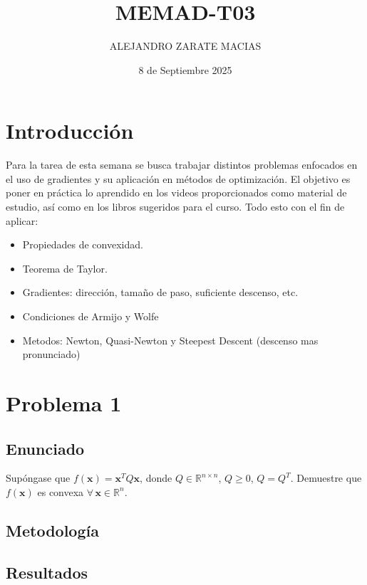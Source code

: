 \documentclass{article}
\title{MEMAD-T03}
\author{ALEJANDRO ZARATE MACIAS}
\date{8 de Septiembre 2025}
\begin{document}
\maketitle

\section*{Introducción}
Para la tarea de esta semana se busca trabajar distintos problemas enfocados en el uso de gradientes y su aplicación en métodos de optimización. El objetivo es poner en práctica lo aprendido en los videos proporcionados como material de estudio, así como en los libros sugeridos para el curso. Todo esto con el fin de aplicar:

\begin{itemize}
    \item Propiedades de convexidad.
    \item Teorema de Taylor.
    \item Gradientes: dirección, tamaño de paso, suficiente descenso, etc.
    \item Condiciones de Armijo y Wolfe
    \item Metodos: Newton, Quasi-Newton y Steepest Descent (descenso mas pronunciado)
\end{itemize}
\section{Problema 1}

\subsection{Enunciado}
Supóngase que $f(\mathbf{x}) = \mathbf{x}^T Q \mathbf{x}$, donde $Q \in \mathbb{R}^{n \times n}$, $Q \geq 0$, $Q = Q^T$. Demuestre que $f(\mathbf{x})$ es convexa $\forall \, \mathbf{x} \in \mathbb{R}^n$.

\subsection{Metodología}

\subsection{Resultados}
\setcounter{equation}{0}
\end{document}
